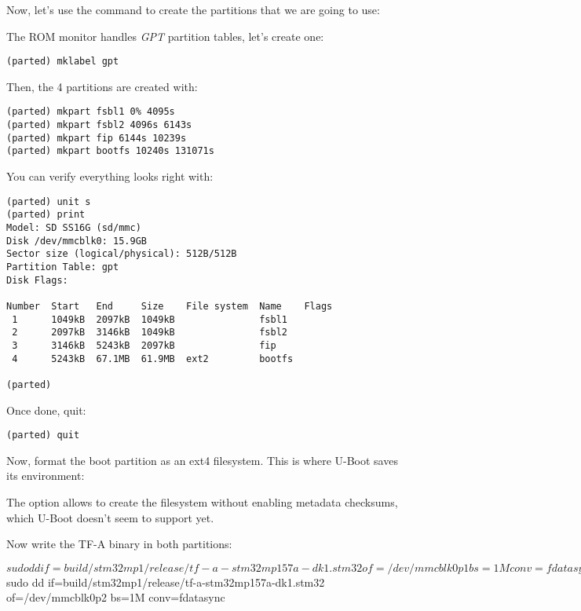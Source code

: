 
Now, let's use the  command to create the partitions that
we are going to use:


The ROM monitor handles {\em GPT} partition tables, let's create one:

\begin{verbatim}
(parted) mklabel gpt
\end{verbatim}

Then, the 4 partitions are created with:
\begin{verbatim}
(parted) mkpart fsbl1 0% 4095s
(parted) mkpart fsbl2 4096s 6143s
(parted) mkpart fip 6144s 10239s
(parted) mkpart bootfs 10240s 131071s
\end{verbatim}

You can verify everything looks right with:

\begin{verbatim}
(parted) unit s
(parted) print
Model: SD SS16G (sd/mmc)
Disk /dev/mmcblk0: 15.9GB
Sector size (logical/physical): 512B/512B
Partition Table: gpt
Disk Flags:

Number  Start   End     Size    File system  Name    Flags
 1      1049kB  2097kB  1049kB               fsbl1
 2      2097kB  3146kB  1049kB               fsbl2
 3      3146kB  5243kB  2097kB               fip
 4      5243kB  67.1MB  61.9MB  ext2         bootfs

(parted)
\end{verbatim}

Once done, quit:
\begin{verbatim}
(parted) quit
\end{verbatim}

Now, format the boot partition as an ext4 filesystem. This is where
U-Boot saves its environment:

The  option allows to create the filesystem
without enabling metadata checksums, which U-Boot doesn't seem to
support yet.

Now write the TF-A binary in both  partitions:

\begin{bashinput}
$ sudo dd if=build/stm32mp1/release/tf-a-stm32mp157a-dk1.stm32 of=/dev/mmcblk0p1 bs=1M conv=fdatasync
$ sudo dd if=build/stm32mp1/release/tf-a-stm32mp157a-dk1.stm32 of=/dev/mmcblk0p2 bs=1M conv=fdatasync
\end{bashinput}

